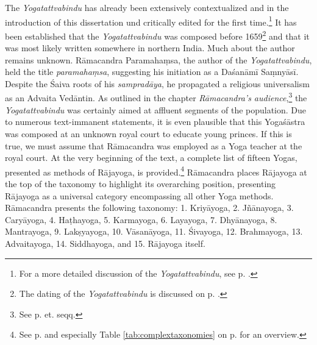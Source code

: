 The \emph{Yogatattvabindu} has already been extensively contextualized and in the introduction of this dissertation und critically edited for the first time.\footnote{For a more detailed discussion of the \emph{Yogatattvabindu}, see p. \pageref{generalremarks}.} It has been established that the \emph{Yogatattvabindu} was composed before 1659\footnote{The dating of the \emph{Yogatattvabindu} is discussed on p. \pageref{dating}.} and that it was most likely written somewhere in northern India. Much about the author remains unknown. Rāmacandra Paramahaṃsa, the author of the \emph{Yogatattvabindu}, held the title \textit{paramahaṃsa}, suggesting his initiation as a Daśanāmī Saṃnyāsī. Despite the Śaiva roots of his \textit{sampradāya}, he propagated a religious universalism as an Advaita Vedāntin. As outlined in the chapter \textit{Rāmacandra's audience},\footnote{See p. \pageref{ytb-audience} et. seqq.} the \emph{Yogatattvabindu} was certainly aimed at affluent segments of the population. Due to numerous text-immanent statements, it is even plausible that this Yogaśāstra was composed at an unknown royal court to educate young princes. If this is true, we must assume that Rāmacandra was employed as a Yoga teacher at the royal court. At the very beginning of the text, a complete list of fifteen Yogas, presented as methods of Rājayoga, is provided.\footnote{See p. \pageref{intro} and especially Table \ref{tab:complextaxonomies} on p. \pageref{tab:complextaxonomies} for an overview.} Rāmacandra places Rājayoga at the top of the taxonomy to highlight its overarching position, presenting Rājayoga as a universal category encompassing all other Yoga methods. Rāmacandra presents the following taxonomy: 1. Kriyāyoga, 2. Jñānayoga, 3. Caryāyoga, 4. Haṭhayoga, 5. Karmayoga, 6. Layayoga, 7. Dhyānayoga, 8. Mantrayoga, 9. Lakṣyayoga, 10. Vāsanāyoga, 11. Śivayoga, 12. Brahmayoga, 13. Advaitayoga, 14. Siddhayoga, and 15. Rājayoga itself.    

